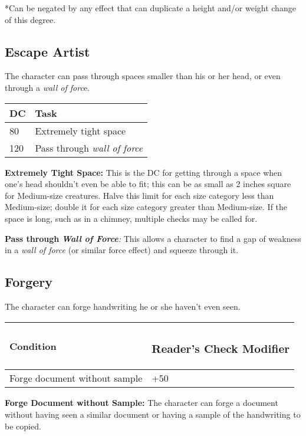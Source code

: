 \documentclass{article}
\begin{document}
*Can be negated by any effect that can duplicate a height and/or weight change 
of this degree. 

\vspace{12pt}
\subsection*{Escape Artist }

The character can pass through spaces smaller than his or her head, or even through 
a \textit{wall of forc}e.

\begin{tabular}{|>{\raggedright}p{13pt}|>{\raggedright}p{103pt}|}
\hline
D\textbf{C} & T\textbf{ask }\tabularnewline
\hline
80 & Extremely tight space \tabularnewline
\hline
120 & Pass through \textit{wall of force }\tabularnewline
\hline
\end{tabular}

\textbf{Extremely Tight Space:}\textit{ }This is the DC for getting through a space 
when one's head shouldn't even be able to fit; this can be as small as 2 inches 
square for Medium-size creatures. Halve this limit for each size category less 
than Medium-size; double it for each size category greater than Medium-size. If 
the space is long, such as in a chimney, multiple checks may be called for. 

\textbf{Pass through }\textit{\textbf{Wall of Force}}\textit{: }This allows a character 
to find a gap of weakness in a \textit{wall of force }(or similar force effect) 
and squeeze through it. 

\vspace{12pt}
\subsection*{Forgery }

The character can forge handwriting he or she haven't even seen.

\begin{tabular}{|>{\raggedright}p{127pt}|>{\raggedright}p{107pt}|}
\hline
C\textbf{ondition} & \subsubsection*{R\textbf{eader's Check Modifier}}\tabularnewline
\hline
Forge document without sample & +50\tabularnewline
\hline
\end{tabular}

\textbf{Forge Document without Sample: }\textit{ }The character can forge a document 
without having seen a similar document or having a sample of the handwriting to 
be copied.
\end{document}
